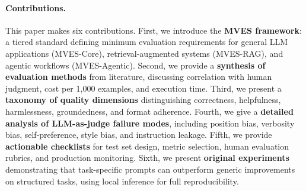 \paragraph{Contributions.}
This paper makes six contributions. First, we introduce the \textbf{MVES framework}: a tiered standard defining minimum evaluation requirements for general LLM applications (MVES-Core), retrieval-augmented systems (MVES-RAG), and agentic workflows (MVES-Agentic). Second, we provide a \textbf{synthesis of evaluation methods} from literature, discussing correlation with human judgment, cost per 1,000 examples, and execution time. Third, we present a \textbf{taxonomy of quality dimensions} distinguishing correctness, helpfulness, harmlessness, groundedness, and format adherence. Fourth, we give a \textbf{detailed analysis of LLM-as-judge failure modes}, including position bias, verbosity bias, self-preference, style bias, and instruction leakage. Fifth, we provide \textbf{actionable checklists} for test set design, metric selection, human evaluation rubrics, and production monitoring. Sixth, we present \textbf{original experiments} demonstrating that task-specific prompts can outperform generic improvements on structured tasks, using local inference for full reproducibility.
